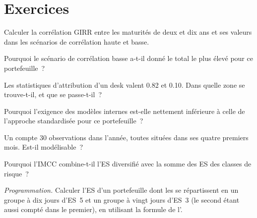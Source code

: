\section{Exercices}

\begin{exercise}[$\star$]\label{exo:rc:regulatory-capital-for-trading-books:1}
Calculer la corrélation GIRR entre les maturités de deux et dix ans et ses valeurs dans les scénarios
de corrélation haute et basse.
\end{exercise}

\begin{exercise}[$\star$]\label{exo:rc:regulatory-capital-for-trading-books:2}
Pourquoi le scénario de corrélation basse a-t-il donné le total le plus élevé pour ce portefeuille~?
\end{exercise}

\begin{exercise}[$\star$]\label{exo:rc:regulatory-capital-for-trading-books:3}
Les statistiques d'attribution d'un desk valent 0.82 et 0.10. Dans quelle zone se trouve-t-il, et que se passe-t-il~?
\end{exercise}

\begin{exercise}[$\star\star$]\label{exo:rc:regulatory-capital-for-trading-books:4}
Pourquoi l'exigence des modèles internes est-elle nettement inférieure à celle de l'approche standardisée pour ce portefeuille~?
\end{exercise}

\begin{exercise}[$\star\star$]\label{exo:rc:regulatory-capital-for-trading-books:5}
Un  compte 30 observations dans l'année, toutes situées dans ses quatre premiers mois. Est-il modélisable~?
\end{exercise}

\begin{exercise}[$\star\star$]\label{exo:rc:regulatory-capital-for-trading-books:6}
Pourquoi l'IMCC combine-t-il l'ES diversifié avec la somme des ES des classes de risque~?
\end{exercise}

\begin{exercise}[$\star\star\star$]\label{exo:rc:regulatory-capital-for-trading-books:7}
\emph{Programmation.} Calculer l'ES d'un portefeuille dont les  se répartissent en un groupe à dix jours d'ES~5
et un groupe à vingt jours d'ES~3 (le second étant aussi compté dans le premier), en utilisant la formule de l'.
\end{exercise}

